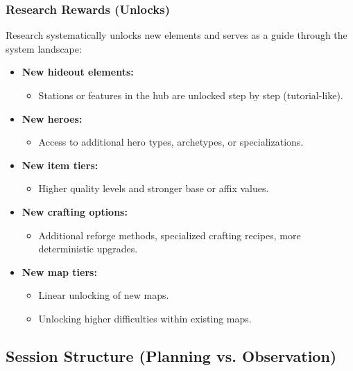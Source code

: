 \subsubsection*{Research Rewards (Unlocks)}

Research systematically unlocks new elements and serves as a guide through the system landscape:

\begin{itemize}
	\item \textbf{New hideout elements:}
	\begin{itemize}
		\item Stations or features in the hub are unlocked step by step (tutorial-like).
	\end{itemize}
	\item \textbf{New heroes:}
	\begin{itemize}
		\item Access to additional hero types, archetypes, or specializations.
	\end{itemize}
	\item \textbf{New item tiers:}
	\begin{itemize}
		\item Higher quality levels and stronger base or affix values.
	\end{itemize}
	\item \textbf{New crafting options:}
	\begin{itemize}
		\item Additional reforge methods, specialized crafting recipes, more deterministic upgrades.
	\end{itemize}
	\item \textbf{New map tiers:}
	\begin{itemize}
		\item Linear unlocking of new maps.
		\item Unlocking higher difficulties within existing maps.
	\end{itemize}
\end{itemize}


\subsection{Session Structure (Planning vs. Observation)}

